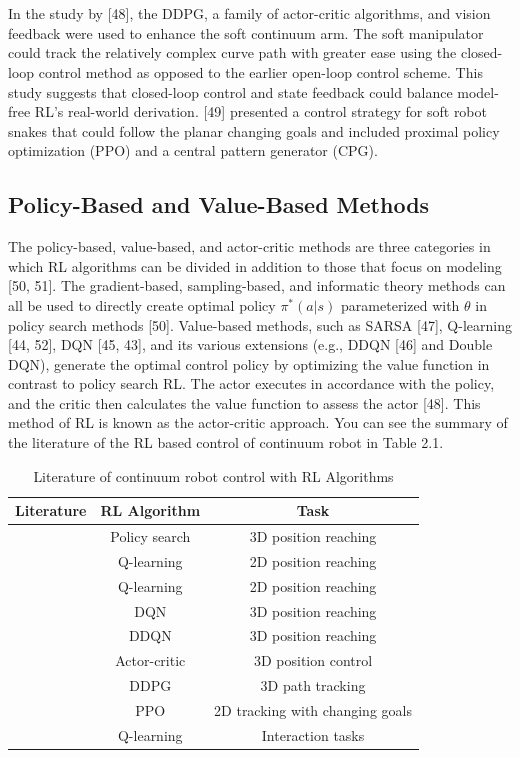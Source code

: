 \documentclass[12pt,twoside,a4]{mwbk}
\begin{document}
\\ \\
In the study by [48], the DDPG, a family of actor-critic algorithms, and vision feedback were used to enhance the soft continuum arm. The soft manipulator could track the relatively complex curve path with greater ease using the closed-loop control method as opposed to the earlier open-loop control scheme. This study suggests that closed-loop control and state feedback could balance model-free RL's real-world derivation. [49] presented a control strategy for soft robot snakes that could follow the planar changing goals and included proximal policy optimization (PPO) and a central pattern generator (CPG).

\subsection{Policy-Based and Value-Based Methods}
The policy-based, value-based, and actor-critic methods are three categories in which RL algorithms can be divided in addition to those that focus on modeling [50, 51]. The gradient-based, sampling-based, and informatic theory methods can all be used to directly create optimal policy $\pi^{*}(a|s)$ parameterized with $\theta$ in policy search methods [50]. Value-based methods, such as SARSA [47], Q-learning [44, 52], DQN [45, 43], and its various extensions (e.g., DDQN [46] and Double DQN), generate the optimal control policy by optimizing the value function in contrast to policy search RL. The actor executes in accordance with the policy, and the critic then calculates the value function to assess the actor [48]. This method of RL is known as the actor-critic approach. You can see the summary of the literature of the RL based control of continuum robot in Table 2.1. 

\begin{table}[h!]
\centering
\begin{adjustbox}{width=1\textwidth}
\begin{tabular}{||c c c||} 
 \hline
 \textbf{Literature} &\textbf{RL Algorithm} & \textbf{Task} \\ [0.5ex] 
 \hline\hline
 [42] & Policy search & 3D position reaching \\ 
 \hline
 [43] & Q-learning & 2D position reaching \\
 \hline
 [44] & Q-learning & 2D position reaching \\
 \hline
 [45] & DQN & 3D position reaching \\
 \hline
 [46] & DDQN & 3D position reaching \\ 
 \hline
 [47] & Actor-critic & 3D position control \\
 \hline
 [48] & DDPG & 3D path tracking \\
 \hline
 [49] & PPO & 2D tracking with changing goals \\ 
 \hline
 [52] & Q-learning & Interaction tasks \\ [1ex]
 \hline
\end{tabular}
\end{adjustbox}
\caption{Literature of continuum robot control with RL Algorithms}
\end{table}
\end{document}
